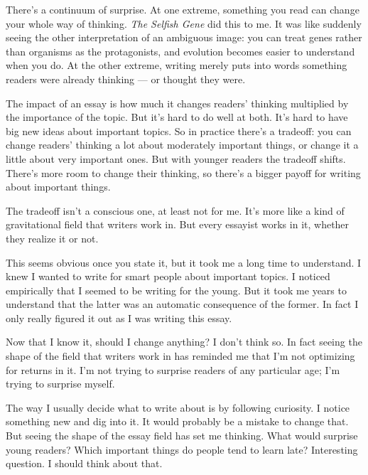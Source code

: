 There's a
                  continuum of surprise. At one extreme, something you read can
                  change your whole way of thinking. \emph{The Selfish Gene} did
                  this to me. It was like suddenly seeing the other
                  interpretation of an ambiguous image: you can treat genes
                  rather than organisms as the protagonists, and evolution
                  becomes easier to understand when you do. At the other
                  extreme, writing merely puts into words something readers were
                  already thinking --- or thought they were.

The
                  impact of an essay is how much it changes readers' thinking
                  multiplied by the importance of the topic. But it's hard to do
                  well at both. It's hard to have big new ideas about important
                  topics. So in practice there's a tradeoff: you can change
                  readers' thinking a lot about moderately important things, or
                  change it a little about very important ones. But with younger
                  readers the tradeoff shifts. There's more room to change their
                  thinking, so there's a bigger payoff for writing about
                  important things.

The tradeoff isn't a conscious
                  one, at least not for me. It's more like a kind of
                  gravitational field that writers work in. But every essayist
                  works in it, whether they realize it or not.

This
                  seems obvious once you state it, but it took me a long time to
                  understand. I knew I wanted to write for smart people about
                  important topics. I noticed empirically that I seemed to be
                  writing for the young. But it took me years to understand that
                  the latter was an automatic consequence of the former. In fact
                  I only really figured it out as I was writing this essay.

Now
                  that I know it, should I change anything? I don't think so. In
                  fact seeing the shape of the field that writers work in has
                  reminded me that I'm not optimizing for returns in it. I'm not
                  trying to surprise readers of any particular age; I'm trying
                  to surprise myself.

The way I usually decide what
                  to write about is by following curiosity. I notice something
                  new and dig into it. It would probably be a mistake to change
                  that. But seeing the shape of the essay field has set me
                  thinking. What would surprise young readers? Which important
                  things do people tend to learn late? Interesting question. I
                  should think about that.








